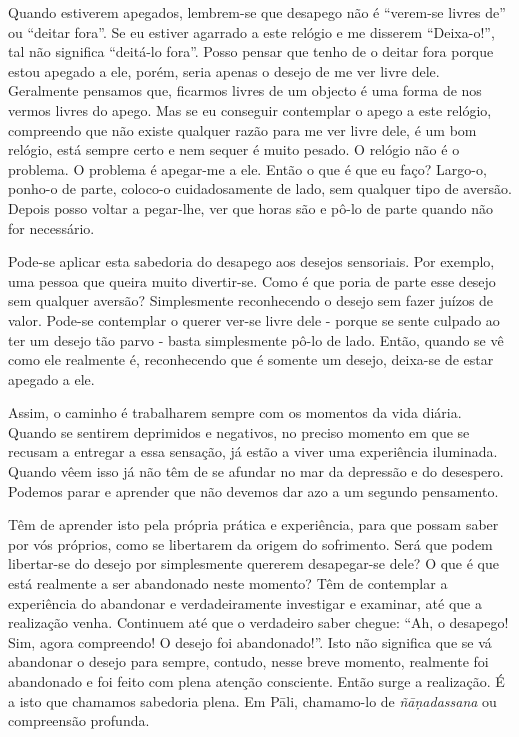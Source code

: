 Quando estiverem apegados, lembrem-se que desapego não é “verem-se livres de” ou
“deitar fora”. Se eu estiver agarrado a este relógio e me disserem “Deixa-o!”,
tal não significa “deitá-lo fora”. Posso pensar que tenho de o deitar fora
porque estou apegado a ele, porém, seria apenas o desejo de me ver livre dele.
Geralmente pensamos que, ficarmos livres de um objecto é uma forma de nos vermos
livres do apego. Mas se eu conseguir contemplar o apego a este relógio,
compreendo que não existe qualquer razão para me ver livre dele, é um bom
relógio, está sempre certo e nem sequer é muito pesado. O relógio não é o
problema. O problema é apegar-me a ele. Então o que é que eu faço? Largo-o,
ponho-o de parte, coloco-o cuidadosamente de lado, sem qualquer tipo de aversão.
Depois posso voltar a pegar-lhe, ver que horas são e pô-lo de parte quando não
for necessário.

Pode-se aplicar esta sabedoria do desapego aos desejos sensoriais. Por exemplo,
uma pessoa que queira muito divertir-se. Como é que poria de parte esse desejo
sem qualquer aversão? Simplesmente reconhecendo o desejo sem fazer juízos de
valor. Pode-se contemplar o querer ver-se livre dele - porque se sente culpado
ao ter um desejo tão parvo - basta simplesmente pô-lo de lado. Então, quando se
vê como ele realmente é, reconhecendo que é somente um desejo, deixa-se de estar
apegado a ele.

Assim, o caminho é trabalharem sempre com os momentos da vida diária. Quando se
sentirem deprimidos e negativos, no preciso momento em que se recusam a entregar
a essa sensação, já estão a viver uma experiência iluminada. Quando vêem isso já
não têm de se afundar no mar da depressão e do desespero. Podemos parar e
aprender que não devemos dar azo a um segundo pensamento.

Têm de aprender isto pela própria prática e experiência, para que possam saber
por vós próprios, como se libertarem da origem do sofrimento. Será que podem
libertar-se do desejo por simplesmente quererem desapegar-se dele? O que é que
está realmente a ser abandonado neste momento? Têm de contemplar a experiência
do abandonar e verdadeiramente investigar e examinar, até que a realização
venha. Continuem até que o verdadeiro saber chegue: “Ah, o desapego! Sim, agora
compreendo! O desejo foi abandonado!”. Isto não significa que se vá abandonar o
desejo para sempre, contudo, nesse breve momento, realmente foi abandonado e foi
feito com plena atenção consciente. Então surge a realização. É a isto que
chamamos sabedoria plena. Em Pāli, chamamo-lo de \emph{ñāṇadassana} ou
compreensão profunda.

